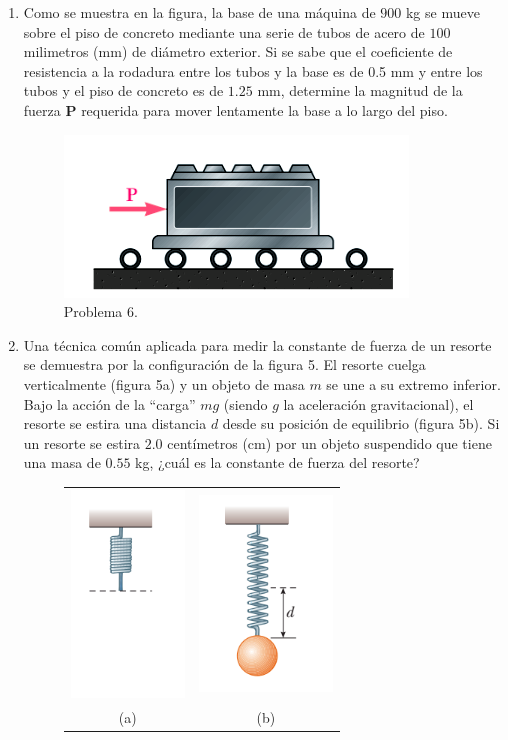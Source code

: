 \documentclass{article}
\begin{document}
\begin{enumerate}
\item Como se muestra en la figura, la base de una máquina de $900$ kg se mueve sobre el piso de concreto mediante una serie de tubos de acero de $100$ milimetros (mm) de diámetro exterior. Si se sabe que el coeficiente de resistencia a la rodadura entre los tubos y la base es de 0.5 mm y entre los tubos y el piso de concreto es de $1$.$25$ mm, determine la magnitud de la fuerza $\textbf{P}$ requerida para mover lentamente la base a lo largo del piso.

\begin{figure}[H]
\centering
\includegraphics[scale=0.5]{problema_6.png}
\caption{Problema 6.}
\end{figure}

\item Una técnica común aplicada para medir la constante de fuerza de un resorte se demuestra por la configuración de la figura 5. El resorte cuelga verticalmente (figura 5a) y un objeto de masa $m$ se une a su extremo inferior. Bajo la acción de la “carga” $mg$ (siendo $g$ la aceleración gravitacional), el resorte se estira una distancia $d$ desde su posición de equilibrio (figura 5b). Si un resorte se estira $2$.$0$ centímetros (cm) por un objeto suspendido que tiene una masa de $0$.$55$ kg, ¿cuál es la constante de fuerza del resorte?

\begin{figure}[H]
\centering
\begin{tabular}{cc}
\includegraphics[scale=0.5]{problema_7a.png} & \includegraphics[scale=0.5]{problema_7b.png}\\
(a) & (b)
\end{tabular}


\end{figure}
\end{enumerate}
\end{document}
